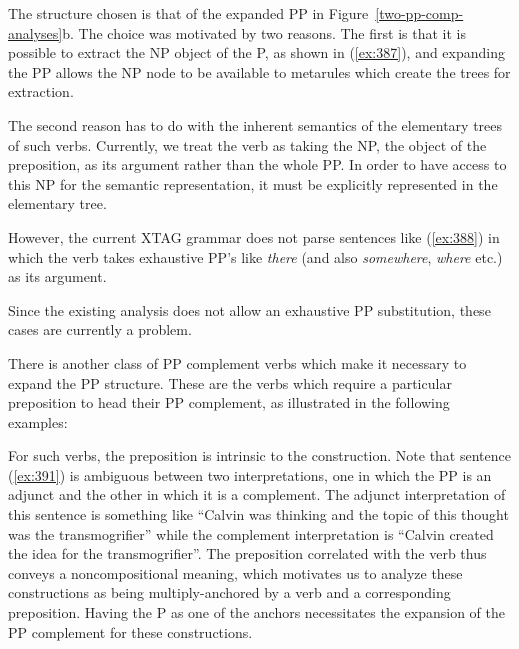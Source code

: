 The structure chosen is that of the expanded PP in 
Figure~\ref{two-pp-comp-analyses}b. The choice was motivated by two 
reasons. The first is that it is possible to extract the NP object of the 
P, as shown in (\ref{ex:387}), and expanding the PP allows the NP node to be 
available to metarules which create the trees for extraction. 
 
\beginsentences
{}\label{ex:387} 
\endsentences

 
The second reason has to do with the inherent semantics of the elementary 
trees of such verbs. Currently, we treat the verb as taking the NP, the 
object of the preposition, as its argument rather than the whole PP. In 
order to have access to this NP for the semantic representation, it must be 
explicitly represented in the elementary tree. 
 
However, the current XTAG grammar does not parse sentences like (\ref{ex:388}) in 
which the verb takes exhaustive PP's like {\it there} (and also {\it somewhere}, {\it where} etc.) as its argument. 
 
\beginsentences
{}\label{ex:388} 
\endsentences

 
Since the existing analysis does not allow an exhaustive PP substitution, 
these cases are currently a problem. 
 
There is another class of PP complement verbs which make it necessary to 
expand the PP structure. These are the verbs which require a particular 
preposition to head their PP complement, as illustrated in the following 
examples: 
 
\beginsentences
{}\label{ex:389} 
\label{ex:390} 
\label{ex:391} 
\label{ex:392} 
\label{ex:393} 
\label{ex:394} 
\label{ex:395} 
\endsentences

 
For such verbs, the preposition is intrinsic to the construction.  Note 
that sentence (\ref{ex:391}) is ambiguous between two interpretations, one in 
which the PP is an adjunct and the other in which it is a complement.  The 
adjunct interpretation of this sentence is something like ``Calvin was 
thinking and the topic of this thought was the transmogrifier'' while the 
complement interpretation is ``Calvin created the idea for the 
transmogrifier''.  The preposition correlated with the verb thus conveys a 
noncompositional meaning, which motivates us to analyze these constructions 
as being multiply-anchored by a verb and a corresponding preposition. 
Having the P as one of the anchors necessitates the expansion of the PP 
complement for these constructions. 
 
